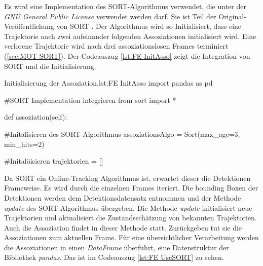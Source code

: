 Es wird eine Implementation des SORT-Algorithmus verwendet, die unter der \textit{GNU General Public License} verwendet werden darf. Sie ist Teil der Original-Veröffentlichung von SORT \cite{Bewley.2016}. Der Algorithmus wird so Initialisiert, dass eine Trajektorie nach zwei aufeinander folgenden Assoziationen initialisiert wird. Eine verlorene Trajektorie wird nach drei assoziationslosen Frames terminiert (\ref{sec:MOT SORT}). Der Codeauszug \ref{lst:FE InitAsso} zeigt die Integration von SORT und die Initialisierung. 

\begin{pythoncode}{Initialisierung der Assoziation.}{lst:FE InitAsso}
import pandas as pd

#SORT Implementation integrieren
from sort import *

def assoziation(self):

    #Initalisieren des SORT-Algorithmus
    assoziationsAlgo = Sort(max_age=3, min_hits=2) 

    #Initalöisieren 
    trajektorien = []

\end{pythoncode}

Da SORT ein Online-Tracking Algorithmus ist, erwartet dieser die Detektionen Frameweise. Es wird durch die einzelnen Frames iteriert. Die bounding Boxen der Detektionen werden dem Detektionsdatensatz entnommen und der Methode \textit{update} des SORT-Algorithmus übergeben. Die Methode \textit{update} initialisiert neue Trajektorien und aktualisiert die Zustandsschätzung von bekannten Trajektorien. Auch die Assoziation findet in dieser Methode statt. Zurückgeben tut sie die Assoziationen zum aktuellen Frame. Für eine übersichtlicher Verarbeitung werden die Assoziationen in einen \textit{DataFrame} überführt, eine Datenstruktur der Bibliothek \textit{pandas}. Das ist im Codeauszug \ref{lst:FE UseSORT} zu sehen.

